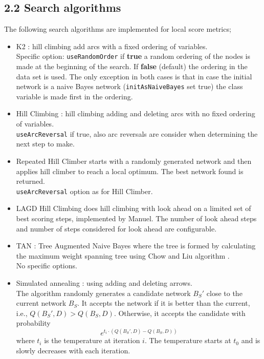 \documentclass{article}
\begin{document}
\subsection*{2.2 Search algorithms \label{sec.score.search}}

The following search algorithms are implemented for local score metrics;
\begin{itemize}
\item K2 \cite{CooperHerskovits1992}: 
hill climbing add arcs with a fixed ordering of variables.\\
Specific option: {\tt useRandomOrder} if {\bf true} a random ordering of
the nodes is made at the beginning of the search. If {\bf false} (default)
the ordering in the data set is used. The only exception in both cases is that
in case the initial network is a naive Bayes network ({\tt initAsNaiveBayes}
set true) the class variable is made first in the ordering.
\item Hill Climbing 
\cite{Buntine1996}: 
hill climbing adding and deleting arcs with no fixed ordering of variables.\\
{\tt useArcReversal} if true, also arc reversals are consider when determining
the next step to make.
\item Repeated Hill Climber starts with a randomly generated network and
then applies hill climber to reach a local optimum. The best network found is
returned.\\
{\tt useArcReversal} option as for Hill Climber.
\item LAGD Hill Climbing does hill climbing with look ahead on a limited set of 
best scoring steps, implemented by Manuel. The number of look ahead steps and number of steps considered
for look ahead are configurable.
\item TAN \cite{ChengGreiner1999,friedman97}:
Tree Augmented Naive Bayes where the tree is formed by calculating the
maximum weight spanning tree using Chow and Liu algorithm \cite{chow1968}.\\
No specific options.
\item Simulated annealing \cite{bouck1995}:
using adding and deleting arrows.\\
The algorithm randomly generates a candidate network $B_S'$ close to the current
network $B_S$. It accepts the network if it is better than the current, i.e.,
$Q(B_S',D) > Q(B_S,D)$. 
Otherwise, it accepts the candidate with probability 
$$e^{t_i \cdot(Q(B_S',D) -Q(B_S,D))}$$
where $t_i$ is the temperature at iteration $i$.
The temperature starts at $t_0$ and is slowly decreases with each iteration. 


\end{itemize}
\end{document}
